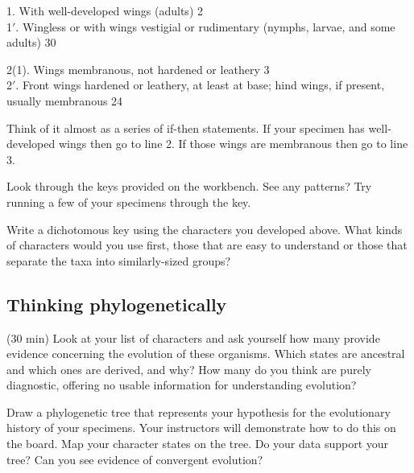 \begin{adjustwidth}{1cm}{}
1. With well-developed wings (adults) \dotfill{} 2\\
1$'$. Wingless or with wings vestigial or rudimentary (nymphs, larvae, and some adults) \dotfill{} 30\vspace{3mm}

\noindent{}2(1). Wings membranous, not hardened or leathery \dotfill{} 3\\
2$'$. Front wings hardened or leathery, at least at base; hind wings, if present, usually membranous \dotfill{}24
\end{adjustwidth}\vspace{3mm}

\noindent{}Think of it almost as a series of if-then statements. If your specimen has well-developed wings then go to line 2. If those wings are membranous then go to line 3.\vspace{3mm}

\noindent{}Look through the keys provided on the workbench. See any patterns? Try running a few of your specimens through the key.\vspace{3mm}

\begin{theo} 
{}Write a dichotomous key using the characters you developed above. What kinds of characters would you use first, those that are easy to understand or those that separate the taxa into similarly-sized groups?\end{theo}\vspace{3mm}

\subsection{Thinking phylogenetically}
(30 min) Look at your list of characters and ask yourself how many provide evidence concerning the evolution of these organisms. Which states are ancestral and which ones are derived, and why? How many do you think are purely diagnostic, offering no usable information for understanding evolution?\vspace{3mm}

\begin{theo}[systematics5] 
{}Draw a phylogenetic tree that represents your hypothesis for the evolutionary history of your specimens. Your instructors will demonstrate how to do this on the board. Map your character states on the tree. Do your data support your tree? Can you see evidence of convergent evolution?\end{theo}


